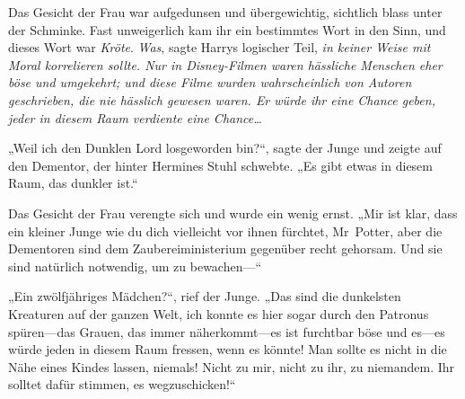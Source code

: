 Das Gesicht der Frau war aufgedunsen und übergewichtig, sichtlich blass unter der Schminke. Fast unweigerlich kam ihr ein bestimmtes Wort in den Sinn, und dieses Wort war \emph{Kröte}.
\emph{Was}, sagte Harrys logischer Teil, \emph{in keiner Weise mit Moral korrelieren sollte. Nur in Disney-Filmen waren hässliche Menschen eher böse und umgekehrt; und diese Filme wurden wahrscheinlich von Autoren geschrieben, die nie hässlich gewesen waren. Er würde ihr eine Chance geben, jeder in diesem Raum verdiente eine Chance…}

„Weil ich den Dunklen Lord losgeworden bin?“, sagte der Junge und zeigte auf den Dementor, der hinter Hermines Stuhl schwebte. „Es gibt etwas in diesem Raum, das dunkler ist.“

Das Gesicht der Frau verengte sich und wurde ein wenig ernst.
„Mir ist klar, dass ein kleiner Junge wie du dich vielleicht vor ihnen fürchtet, Mr~Potter, aber die Dementoren sind dem Zaubereiministerium gegenüber recht gehorsam. Und sie sind natürlich notwendig, um zu bewachen—“

„Ein zwölfjähriges Mädchen?“, rief der Junge. „Das sind die dunkelsten Kreaturen auf der ganzen Welt, ich konnte es hier sogar durch den Patronus spüren—das Grauen, das immer näherkommt—es ist furchtbar böse und es—es würde jeden in diesem Raum fressen, wenn es könnte! Man sollte es nicht in die Nähe eines Kindes lassen, niemals! Nicht zu mir, nicht zu ihr, zu niemandem. Ihr solltet dafür stimmen, es wegzuschicken!“

